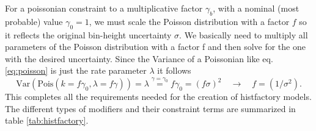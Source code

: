 For a poissonian constraint to a multiplicative factor $\gamma_b$, with a nominal (most probable) value $\gamma_0=1$, we must scale the Poisson distribution with a factor $f$ so it reflects the original bin-height uncertainty $\sigma$. We basically need to multiply all parameters of the Poisson distribution with a factor f and then solve for the one with the desired uncertainty. Since the Variance of a Poissonian like eq. \ref{eq:poisson} is just the rate parameter $\lambda$ it follows
\begin{equation}
    \mathrm{Var}(\mathrm{Pois}(k=f\gamma_0,\lambda=f\gamma))=\lambda\stackrel{\gamma=\gamma_0}{=}f\gamma_0=(f\sigma)^2  \quad \rightarrow \quad f=(1/\sigma^2).
\end{equation}
This completes all the requirements needed for the creation of histfactory models. The different types of modifiers and their constraint terms are summarized in table \ref{tab:histfactory}.
